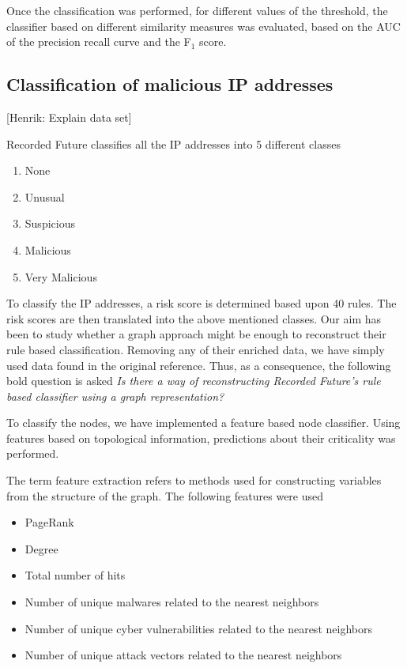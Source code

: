 Once the classification was performed, for different values of the threshold, the classifier based on different similarity measures was evaluated, based on the AUC of the precision recall curve and the F$_1$ score.

\subsection{Classification of malicious IP addresses}

[Henrik: Explain data set]

Recorded Future classifies all the IP addresses into 5 different classes
\begin{enumerate}
    \item None
    \item Unusual
    \item Suspicious
    \item Malicious
    \item Very Malicious
\end{enumerate}
To classify the IP addresses, a risk score is determined based upon 40 rules. The risk scores are then translated into the above mentioned classes. Our aim has been to study whether a graph approach might be enough to reconstruct their rule based classification. Removing any of their enriched data, we have simply used data found in the original reference. Thus, as a consequence, the following bold question is asked \textit{Is there a way of reconstructing Recorded Future's rule based classifier using a graph representation?}

To classify the nodes, we have implemented a feature based node classifier. Using features based on topological information, predictions about their criticality was performed.

The term feature extraction refers to methods used for constructing variables from the structure of the graph. The following features were used
\begin{itemize}
    \item PageRank
    \item Degree
    \item Total number of hits
    \item Number of unique malwares related to the nearest neighbors
    \item Number of unique cyber vulnerabilities related to the nearest neighbors
    \item Number of unique attack vectors related to the nearest neighbors
\end{itemize}

